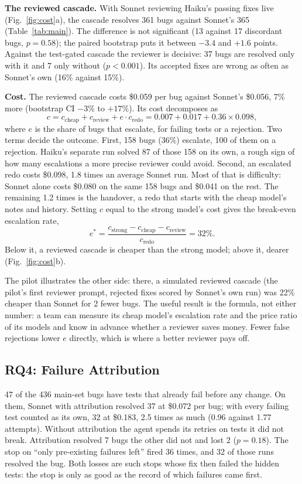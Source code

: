 \documentclass[10pt,conference]{IEEEtran}
\begin{document}
\textbf{The reviewed cascade.} With Sonnet reviewing Haiku's passing fixes live (Fig.~\ref{fig:cost}a), the cascade resolves 361 bugs against
Sonnet's 365 (Table~\ref{tab:main}). The difference is not significant (13 against 17 discordant bugs, $p=0.58$); the
paired bootstrap puts it between $-3.4$ and $+1.6$ points. Against the test-gated cascade the reviewer is decisive: 37
bugs are resolved only with it and 7 only without ($p<0.001$). Its accepted fixes are wrong as often as Sonnet's own
(16\% against 15\%).

\textbf{Cost.} The reviewed cascade costs \$0.059 per bug against Sonnet's \$0.056, 7\% more (bootstrap CI $-3\%$ to
$+17\%$). Its cost decomposes as
\[
c = c_{\text{cheap}} + c_{\text{review}} + e \cdot c_{\text{redo}}
  = 0.007 + 0.017 + 0.36 \times 0.098 ,
\]
where $e$ is the share of bugs that escalate, for failing tests or a rejection. Two terms decide the outcome. First,
158 bugs (36\%) escalate, 100 of them on a rejection. Haiku's separate run solved 87 of those 158 on its own, a rough
sign of how many escalations a more precise reviewer could avoid. Second, an escalated redo costs \$0.098, 1.8 times
an average Sonnet run. Most of that is difficulty: Sonnet alone costs \$0.080 on the same 158 bugs and \$0.041 on
the rest. The remaining 1.2 times is the handover, a redo that starts with the cheap model's notes and history. Setting $c$ equal to the strong model's cost
gives the break-even escalation rate,
\[
e^{*} = \frac{c_{\text{strong}} - c_{\text{cheap}} - c_{\text{review}}}{c_{\text{redo}}} = 32\%.
\]
Below it, a reviewed cascade is cheaper than the strong model; above it, dearer (Fig.~\ref{fig:cost}b).

The pilot illustrates the other side:
there, a simulated reviewed cascade (the pilot's first reviewer prompt, rejected fixes scored by Sonnet's own run)
was 22\% cheaper than Sonnet for 2 fewer bugs. The useful result is the formula, not either number: a team can
measure its cheap model's escalation rate and the price ratio of its models and know in advance whether a reviewer
saves money. Fewer false rejections lower $e$ directly, which is where a better reviewer pays off.

\subsection{RQ4: Failure Attribution}
47 of the 436 main-set bugs have tests that already fail before any change. On them, Sonnet with attribution resolved
37 at \$0.072 per bug; with every failing test counted as its own, 32 at \$0.183, 2.5 times as much (0.96 against
1.77 attempts). Without attribution the agent spends its retries on tests it did not break. Attribution resolved 7
bugs the other did not and lost 2 ($p=0.18$). The stop on ``only pre-existing failures left'' fired 36 times, and 32
of those runs resolved the bug. Both losses are such stops whose fix then failed the hidden tests: the stop is only as
good as the record of which failures came first.
\end{document}
